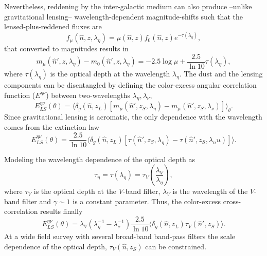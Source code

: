 Nevertheless, reddening by the inter-galactic medium  can also produce --unlike gravitational lensing-- wavelength-dependent magnitude-shifts such that the lensed-plus-reddened fluxes are
\begin{equation}
f_\mu(\hat n,z,\lambda_\eta) = \mu(\hat n,z)f_0(\hat n,z)e^{-\tau(\lambda_\eta)},
\end{equation}
that converted to magnitudes results in
\begin{equation}
m_\mu(\hat n',z,\lambda_\eta)-m_0(\hat n',z,\lambda_\eta)=-2.5\log\mu+\frac{2.5}{\ln 10}\tau(\lambda_\eta),
\end{equation}
where $\tau(\lambda_\eta)$ is the optical depth at the wavelength $\lambda_\eta$. The dust and the lensing components can be disentangled by defining the color-excess angular correlation function ($E^{\eta\nu}$) between two-wavelengths $\lambda_\eta,\lambda_\nu$,
\begin{equation}
E^{\eta\nu}_{LS}(\theta) = \langle\delta_g(\hat n,z_L)[m_\mu(\hat n',z_S,\lambda_\eta)-m_\mu(\hat n',z_S,\lambda_\nu)]\rangle_\theta.
\end{equation}
Since gravitational lensing is acromatic, the only dependence with the wavelength comes from the extinction law
\begin{equation}
E^{\eta\nu}_{LS}(\theta)=\frac{2.5}{\ln 10}\langle\delta_g(\hat n,z_L)[\tau(\hat n',z_S,\lambda_\eta)-\tau(\hat n',z_S,\lambda_nu)]\rangle.
\end{equation}

Modeling the wavelength dependence of the optical depth as
\begin{equation}
\tau_\eta = \tau(\lambda_\eta) = \tau_V\left(\frac{\lambda_V}{\lambda_\eta}\right),
\end{equation}
where $\tau_V$ is the optical depth at the $V$-band filter, $\lambda_V$ is the wavelength of the $V$-band filter and $\gamma\sim 1$ is a constant parameter. Thus, the color-excess cross-correlation results finally
\begin{equation}
E^{\eta\nu}_{LS}(\theta)=\lambda_V(\lambda_\eta^{-1}-\lambda_\nu^{-1})\frac{2.5}{\ln 10}\langle\delta_g(\hat n,z_L)\tau_V(\hat n',z_S)\rangle.
\end{equation}
At a wide field survey with several broad-band band-pass filters the scale dependence of the optical depth, $\tau_V(\hat n,z_S)$ can be constrained.



